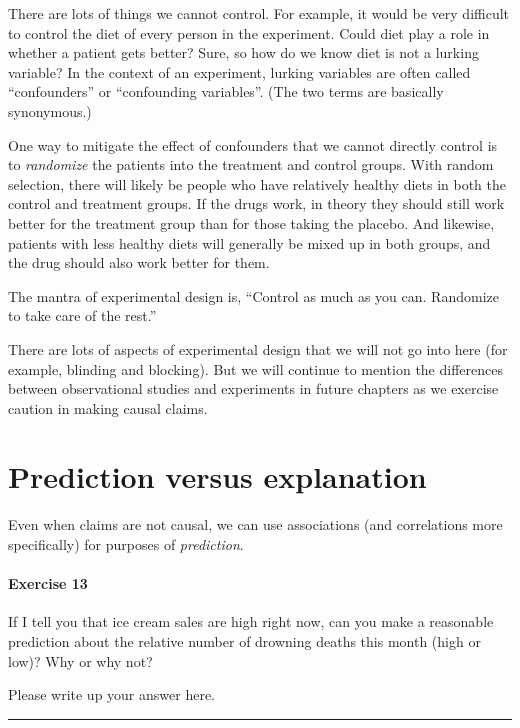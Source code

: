 \documentclass[
]{book}
\begin{document}
There are lots of things we cannot control. For example, it would be very difficult to control the diet of every person in the experiment. Could diet play a role in whether a patient gets better? Sure, so how do we know diet is not a lurking variable? In the context of an experiment, lurking variables are often called ``confounders'' or ``confounding variables''. (The two terms are basically synonymous.)

One way to mitigate the effect of confounders that we cannot directly control is to \emph{randomize} the patients into the treatment and control groups. With random selection, there will likely be people who have relatively healthy diets in both the control and treatment groups. If the drugs work, in theory they should still work better for the treatment group than for those taking the placebo. And likewise, patients with less healthy diets will generally be mixed up in both groups, and the drug should also work better for them.

The mantra of experimental design is, ``Control as much as you can. Randomize to take care of the rest.''

There are lots of aspects of experimental design that we will not go into here (for example, blinding and blocking). But we will continue to mention the differences between observational studies and experiments in future chapters as we exercise caution in making causal claims.

\hypertarget{correlation-pred-exp}{%
\section{Prediction versus explanation}\label{correlation-pred-exp}}

Even when claims are not causal, we can use associations (and correlations more specifically) for purposes of \emph{prediction}.

\hypertarget{exercise-13-1}{%
\paragraph*{Exercise 13}\label{exercise-13-1}}

If I tell you that ice cream sales are high right now, can you make a reasonable prediction about the relative number of drowning deaths this month (high or low)? Why or why not?

Please write up your answer here.

\begin{center}\rule{0.5\linewidth}{0.5pt}\end{center}
\end{document}
